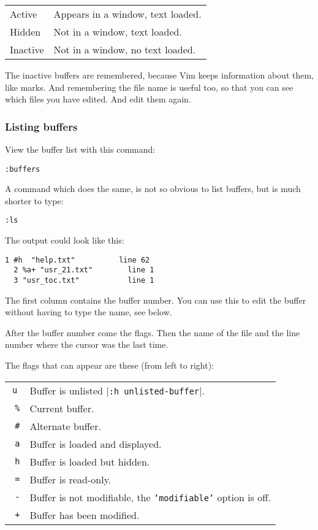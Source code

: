 \begin{center} \begin{tabular}{l l}
				Active & Appears in a window, text loaded. \\
				Hidden & Not in a window, text loaded. \\
				Inactive & Not in a window, no text loaded. \\
\end{tabular} \end{center}

The inactive buffers are remembered, because Vim keeps information about them, like marks.
And remembering the file name is useful too, so that you can see which files you have edited.
And edit them again.

\subsubsection{Listing buffers}
View the buffer list with this command:

\begin{Verbatim}[samepage=true]
 :buffers
\end{Verbatim}

A command which does the same, is not so obvious to list buffers, but is much shorter to type:

\begin{Verbatim}[samepage=true]
 :ls
\end{Verbatim}

The output could look like this:

\begin{Verbatim}[samepage=true]
  1 #h  "help.txt"          line 62 
  2 %a+ "usr_21.txt"        line 1 
  3 "usr_toc.txt"           line 1 
\end{Verbatim}

The first column contains the buffer number.
You can use this to edit the buffer without having to type the name, see below.

After the buffer number come the flags.
Then the name of the file and the line number where the cursor was the last time.
 
The flags that can appear are these (from left to right):
\begin{center} \begin{tabular}{c l}
				\texttt{u} &  Buffer is unlisted |\texttt{:h unlisted-buffer}|. \\
				\texttt{  \%} &  Current buffer. \\
				\texttt{  \#} &  Alternate buffer. \\
				\texttt{    a} & Buffer is loaded and displayed. \\
				\texttt{    h} & Buffer is loaded but hidden. \\
				\texttt{      =} & Buffer is read-only. \\
				\texttt{      -} & Buffer is not modifiable, the \texttt{'modifiable'} option is off. \\
				\texttt{        +} & Buffer has been modified. \\
\end{tabular} \end{center}
